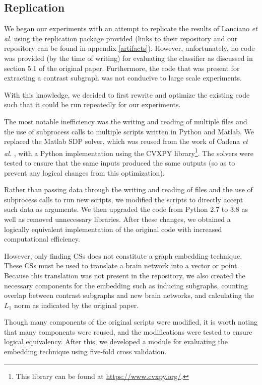 \documentclass[sigconf]{acmart}
\begin{document}
\subsection{Replication}

We began our experiments with an attempt to replicate the results of Lanciano \emph{et al.} using the replication package provided (links to their repository and our repository can be found in appendix \ref{artifacts}).
However, unfortunately, no code was provided (by the time of writing) for evaluating the classifier as discussed in section 5.1 of the original paper.
Furthermore, the code that was present for extracting a contrast subgraph was not conducive to large scale experiments.

With this knowledge, we decided to first rewrite and optimize the existing code such that it could be run repeatedly for our experiments.

The most notable inefficiency was the writing and reading of multiple files and the use of subprocess calls to multiple scripts written in Python and Matlab.
We replaced the Matlab SDP solver, which was reused from the work of Cadena \emph{et al.} \cite{cadena2016}, with a Python implementation using the CVXPY library\footnote{This library can be found at \url{https://www.cvxpy.org/}.}.
The solvers were tested to ensure that the same inputs produced the same outputs (so as to prevent any logical changes from this optimization).

Rather than passing data through the writing and reading of files and the use of subprocess calls to run new scripts, we modified the scripts to directly accept such data as arguments.
We then upgraded the code from Python 2.7 to 3.8 as well as removed unnecessary libraries.
After these changes, we obtained a logically equivalent implementation of the original code with increased computational efficiency.

However, only finding CSs does not constitute a graph embedding technique.
These CSs must be used to translate a brain network into a vector or point.
Because this translation was not present in the repository, we also created the necessary components for the embedding such as inducing subgraphs, counting overlap between contrast subgraphs and new brain networks, and calculating the $L_1$ norm as indicated by the original paper.

Though many components of the original scripts were modified, it is worth noting that many components were reused, and the modifications were tested to ensure logical equivalency.
After this, we developed a module for evaluating the embedding technique using five-fold cross validation.
\end{document}
